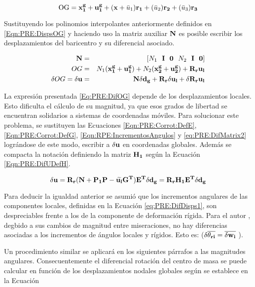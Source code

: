 \begin{equation}\label{Eqn:PRE:DispsOG}
 	\text{OG} = \bf{x}_1^g+\bf{u}_1^g + (x+\text{$\bar{u}_1$}) \bf{r_1} + (\text{$\bar{u}_2$})\bf{r_2}+ (\text{$\bar{u}_3$})\bf{r_3}
\end{equation}

Sustituyendo los polinomios interpolantes anteriormente definidos en \eqref{Eqn:PRE:DispsOG} y haciendo uso la matriz auxiliar $\bf{N}$ es posible escribir los desplazamientos del baricentro y su diferencial asociado.

\begin{eqnarray}
	\bf{N}&=&[\text{$N_1$}~~ \bf{I}~~ \bf{0}~~ \text{$N_2$}~~ \bf{I}~~ \bf{0}]\\
	OG    &=& \text{$N_1$}(\bf{x}_1^g+\bf{u}_1^g)+\text{$N_2$}(\bf{x}_2^g+\bf{u}_2^g)+ \bf{R}_r \bf{u}_l \\ \label{Eq:PRE:DifOG}
	\delta OG = \delta \bf{u} &= &\bf{N}\delta\bf{d}_g+\bf{R}_r \delta\bf{u}_l + \delta \bf{R}_r \bf{u}_l
\end{eqnarray}

 La expresión presentada \eqref{Eq:PRE:DifOG} depende de los desplazamientos locales. Esto dificulta el cálculo de su magnitud, ya que esos grados de libertad se encuentran solidarios a sistemas de coordenadas móviles. Para solucionar este problema, se sustituyen las Ecuaciones \eqref{Eqn:PRE:Corrot:DefE}, \eqref{Eqn:PRE:Corrot:DefG}, \eqref{Eqn:RPE:IncrementosAngulos} y \eqref{eq:PRE:DifMatrix2} lográndose de este modo, escribir a $ \delta \bf{u}$ en coordenadas globales. Además se compacta la notación definiendo la matriz $\bf{H}_1$ según la Ecuación \eqref{Eqn:PRE:DifUDefH}.

 \begin{equation}\label{Eqn:PRE:DifUDefH}
	\delta \bf{u} = \bf{R}_r(\bf{N}+\bf{P}_1\bf{P}-\widetilde{\bf{u}_l}\bf{G}^T)\bf{E}^T \delta \bf{d}_g = \bf{R}_r \bf{H}_1 \bf{E}^T \delta \bf{d}_g
 \end{equation}

 Para deducir la igualdad anterior se asumió que los incrementos angulares de las componentes locales, definidas en la Ecuación \eqref{eq:PRE:DifDisps1}, son despreciables frente a los de la componente de deformación rígida. Para el autor \cite{Le2014}, degbido a sus cambios de magnitud entre miseraciones, no hay diferencias asociadas a los incrementos de ángulos locales y rígidos. Esto es: ($\delta \overline{\bf{\theta}_{ri}}= \overline{\delta \bf{w}_i}$ ).

 Un procedimiento similar se aplicará en los siguientes párrafos a las magnitudes angulares. Consecuentemente el diferencial rotación del centro de masa se puede calcular en función de los desplazamientos nodales globales según se establece en la Ecuación

